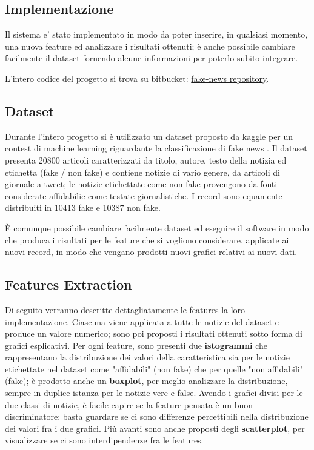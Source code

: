 \documentclass{article}
\begin{document}
\begin{multicols}{2}
		    
	    \section{Implementazione}
		    Il sistema e' stato implementato in modo da poter inserire, in qualsiasi momento, una nuova feature ed analizzare i risultati ottenuti; è anche possibile cambiare facilmente il dataset fornendo alcune informazioni per poterlo subito integrare.
		    
		    L'intero codice del progetto si trova su bitbucket: 
		    \href{https://bitbucket.org/IcedGarion/fake-news}{fake-news repository}. 
		    
			\subsection{Dataset}
			Durante l'intero progetto si è utilizzato un dataset proposto da kaggle per un contest di machine learning riguardante la classificazione di fake news \cite{kaggledataset}. Il dataset presenta 20800 articoli caratterizzati da titolo, autore, testo della notizia ed etichetta (fake / non fake) e contiene notizie di vario genere, da articoli di giornale a tweet; le notizie etichettate come non fake provengono da fonti considerate affidabilic come testate giornalistiche. I record sono equamente distribuiti in 10413 fake e 10387 non fake.
			
			È comunque possibile cambiare facilmente dataset ed eseguire il software in modo che produca i risultati per le feature che si vogliono considerare, applicate ai nuovi record, in modo che vengano prodotti nuovi grafici relativi ai nuovi dati.
			
			
			\subsection{Features Extraction}
			Di seguito verranno descritte dettagliatamente le features la loro implementazione.
			Ciascuna viene applicata a tutte le notizie del dataset e produce un valore numerico; sono poi proposti i risultati ottenuti sotto forma di grafici esplicativi. Per ogni feature, sono presenti due \textbf{istogrammi} che rappresentano la distribuzione dei valori della caratteristica sia per le notizie etichettate nel dataset come "affidabili" (non fake) che per quelle "non affidabili" (fake); è prodotto anche un \textbf{boxplot}, per meglio analizzare la distribuzione, sempre in duplice istanza per le notizie vere e false. 
			Avendo i grafici divisi per le due classi di notizie, è facile capire se la feature pensata è un buon discriminatore: basta guardare se ci sono differenze percettibili nella distribuzione dei valori fra i due grafici.
			Più avanti sono anche proposti degli \textbf{scatterplot}, per visualizzare se ci sono interdipendenze fra le features.
			

\end{multicols}
\end{document}
